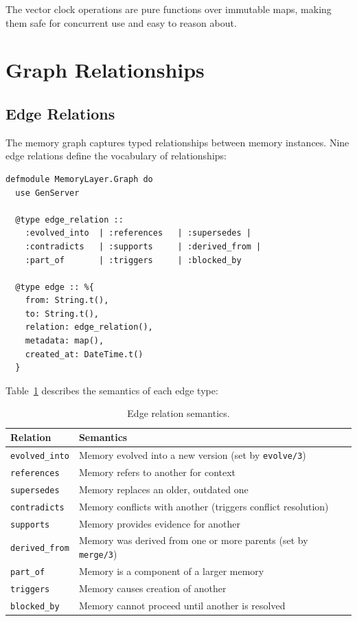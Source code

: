 \documentclass[12pt,a4paper]{article}
\theoremstyle{definition}
\begin{document}
The vector clock operations are pure functions over immutable maps, making them safe for concurrent use and easy to reason about.

\section{Graph Relationships}\label{sec:graph}

\subsection{Edge Relations}\label{subsec:edge-relations}

The memory graph captures typed relationships between memory instances.
Nine edge relations define the vocabulary of relationships:

\begin{lstlisting}[caption={The nine edge relation types.}, label={lst:edge-relations}]
defmodule MemoryLayer.Graph do
  use GenServer

  @type edge_relation ::
    :evolved_into  | :references   | :supersedes |
    :contradicts   | :supports     | :derived_from |
    :part_of       | :triggers     | :blocked_by

  @type edge :: %{
    from: String.t(),
    to: String.t(),
    relation: edge_relation(),
    metadata: map(),
    created_at: DateTime.t()
  }
\end{lstlisting}

Table~\ref{tab:edge-relations} describes the semantics of each edge type:

\begin{table}[H]
\centering
\caption{Edge relation semantics.}
\label{tab:edge-relations}
\begin{tabularx}{\textwidth}{lX}
\toprule
\textbf{Relation} & \textbf{Semantics} \\
\midrule
\texttt{evolved\_into} & Memory evolved into a new version (set by \texttt{evolve/3}) \\
\texttt{references} & Memory refers to another for context \\
\texttt{supersedes} & Memory replaces an older, outdated one \\
\texttt{contradicts} & Memory conflicts with another (triggers conflict resolution) \\
\texttt{supports} & Memory provides evidence for another \\
\texttt{derived\_from} & Memory was derived from one or more parents (set by \texttt{merge/3}) \\
\texttt{part\_of} & Memory is a component of a larger memory \\
\texttt{triggers} & Memory causes creation of another \\
\texttt{blocked\_by} & Memory cannot proceed until another is resolved \\
\bottomrule
\end{tabularx}
\end{table}
\end{document}
